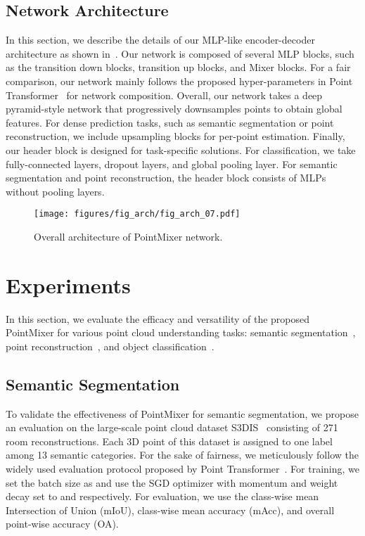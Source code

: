 \subsection{Network Architecture}
\label{subsec:Network Architecture}
In this section, we describe the details of our MLP-like encoder-decoder architecture as shown in~.
Our network is composed of several MLP blocks, such as the transition down blocks, transition up blocks, and Mixer blocks. For a fair comparison, our network mainly follows the proposed hyper-parameters in Point Transformer~\cite{point-transformer} for network composition. Overall, our network takes a deep pyramid-style network that progressively downsamples points to obtain global features. For dense prediction tasks, such as semantic segmentation or point reconstruction, we include upsampling blocks for per-point estimation. Finally, our header block is designed for task-specific solutions. 
For classification, we take fully-connected layers, dropout layers, and global pooling layer. For semantic segmentation and point reconstruction, the header block consists of MLPs without pooling layers.
%
 \begin{figure*}[!t]
\centering
\texttt{[image: figures/fig\_arch/fig\_arch\_07.pdf]}
\vspace{-6mm}
\caption{Overall architecture of PointMixer network.}
\vspace{-2mm}
\label{fig:fig_arch}
\end{figure*} 


\section{Experiments}
\label{sec:Experiments}
\vspace{-1mm}
In this section, we evaluate the efficacy and versatility of the proposed PointMixer for various point cloud understanding tasks: semantic segmentation~\cite{armeni_cvpr16}, point reconstruction~\cite{point-recon}, and object classification~\cite{modelnet40}. 




 
\vspace{-1mm}
\subsection{Semantic Segmentation}
\label{subsec:Semantic segmentation}
To validate the effectiveness of PointMixer for semantic segmentation, we propose an evaluation on the large-scale point cloud dataset S3DIS~\cite{armeni_cvpr16} consisting of 271 room reconstructions. Each 3D point of this dataset is assigned to one label among 13 semantic categories.
For the sake of fairness, we meticulously follow the widely used evaluation protocol proposed by Point Transformer~\cite{point-transformer}. For training, we set the batch size as  and use the SGD optimizer with momentum and weight decay set to  and  respectively. For evaluation, we use the class-wise mean Intersection of Union (mIoU), class-wise mean accuracy (mAcc), and overall point-wise accuracy (OA).

